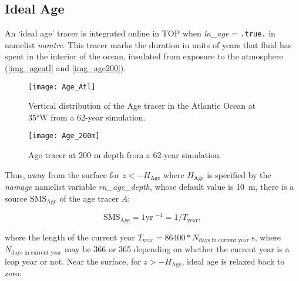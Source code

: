 \documentclass[../main/TOP_manual]{subfiles}
\begin{document}
\label{SMS_models}

\subsection{Ideal Age}

An `ideal age' tracer is integrated online in TOP when \textit{ln\_age} = \texttt{.true.} in namelist \textit{namtrc}.
This tracer marks the duration in units of years that fluid has spent in the interior of the ocean, insulated from exposure to the atmosphere  (\autoref{img_ageatl} and \autoref{img_age200}).

\begin{figure}[!h]
	\centering
	\texttt{[image: Age\_Atl]}
	\caption{Vertical distribution of the Age tracer in the Atlantic Ocean at 35°W from a 62-year simulation.}
	\label{img_ageatl}
\end{figure}

\begin{figure}[!h]
	\centering
	\texttt{[image: Age\_200m]}
	\caption{Age tracer at 200 m depth from a 62-year simulation.}
	\label{img_age200}
\end{figure}

Thus, away from the surface for $z<-H_{\mathrm{Age}}$ where $H_{\mathrm{Age}}$ is specified by the \textit{namage} namelist variable \textit{rn\_age\_depth}, whose default value is 10~m, there is a source $\mathrm{SMS_{\mathrm{Age}}}$ of the age tracer $A$:

\begin{equation}
  \label{eq:TOP-age-interior}
  \mathrm{SMS_{\mathrm{Age}}} = 1 \mathrm{yr}\;^{-1} = 1/T_{\mathrm{year}},
\end{equation}

where the length of the current year $T_{\mathrm{year}} = 86400*N_{\mathrm{days\;in\;current\; year}}\;\mathrm{s}$, where $N_{\mathrm{days\;in\;current\; year}}$ may be 366 or 365 depending on whether the current year is a leap year or not.
Near the surface, for $z>-H_{\mathrm{Age}}$, ideal age is relaxed back to zero:
\end{document}
